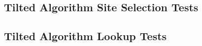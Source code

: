 % 

\subsection{Tilted Algorithm Site Selection Tests}



\subsection{Tilted Algorithm Lookup Tests}


